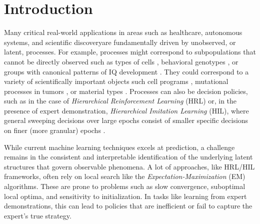 \chapter{Introduction}
Many critical real-world applications in areas such as healthcare, autonomous systems, and scientific discoveryare fundamentally driven by unobserved, or latent, processes. 
For example, processes might correspond to subpopulations that cannot be directly observed such as
types of cells \citep{Gorsky:2020,Prabhakaran:2016}, behavioral genotypes \citep{Stevens:2019}, or
groups with canonical patterns of IQ development \citep{Bauer:2007}.
They could correspond to a variety of scientifically important objects such cell programs \citep{Kotliar_Identify_Cell_Idendity_Activity_NMF_2019,Buettner_FscLVM_ScalableVersatile_FA_2017,Risso_General_Flexible_Signal_Extract_2018},
mutational processes in tumors %
\citep{Levitin_DeNovo_Gene_Signature_Identification_2019,Kinker_Pan_Cancer_2020,Seplyarskiy_PopulationSequencingData_2021},
or material types
\citep{Fevotte_NonlinearHyperspectralUnmixing_2015,Rajabi_SpectralUnmixingHyperspectral_2015}.
Processes can also be decision policies, such as in the case of 
\emph{Hierarchical Reinforcement Learning} (HRL) or, in the presence of expert demonstration, \emph{Hierarchical Imitation Learning} (HIL), where
general sweeping decisions over large epochs consist of  
smaller specific decisions on finer (more granular) epochs \citep{SUTTON1999181, Barto2003}. 

While current machine learning techniques excels at prediction, a challenge remains in the 
consistent and interpretable identification of the underlying latent structures that 
govern observable phenomena. A lot of approaches, like HRL/HIL frameworks, 
often rely on local search like the \emph{Expectation-Maximization} (EM) algorithms. These are prone to problems such as 
slow convergence, suboptimal local optima, and sensitivity to initialization. 
In tasks like learning from expert demonstrations, this can lead to policies that are inefficient or fail to capture the expert's true strategy.

